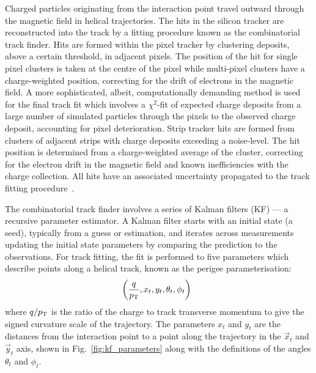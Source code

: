Charged particles originating from the interaction point travel outward through the magnetic field in helical trajectories. The hits in the silicon tracker are reconstructed into the track by a fitting procedure known as the combinatorial track finder. Hits are formed within the pixel tracker by clustering deposits, above a certain threshold, in adjacent pixels. The position of the hit for single pixel clusters is taken at the centre of the pixel while multi-pixel clusters have a charge-weighted position, correcting for the drift of electrons in the magnetic field. A more sophisticated, albeit, computationally demanding method is used for the final track fit which involves a $\chi^2$-fit of expected charge deposits from a large number of simulated particles through the pixels to the observed charge deposit, accounting for pixel deterioration. Strip tracker hits are formed from clusters of adjacent strips with charge deposits exceeding a noise-level. The hit position is determined from a charge-weighted average of the cluster, correcting for the electron drift in the magnetic field and known inefficiencies with the charge collection. All hits have an associated uncertainty propagated to the track fitting procedure~\cite{Chatrchyan:1704291}.

The combinatorial track finder involves a series of Kalman filters (KF) \cite{Kalman:1960} --- a recursive parameter estimator. A Kalman filter starts with an initial state (a seed), typically from a guess or estimation, and iterates across measurements updating the initial state parameters by comparing the prediction to the observations. For track fitting, the fit is performed to five parameters which describe points along a helical track, known as the perigee parameterisation:
%
\begin{equation}
    \left( \frac{q}{p_{\text{T}}}, x_t, y_t, \theta_t, \phi_t \right)\ \,
\end{equation}
%
where $q/p_{\text{T}}$ is the ratio of the charge to track transverse momentum to give the signed curvature scale of the trajectory. The parameters $x_t$ and $y_t$ are the distances from the interaction point to a point along the trajectory in the $\vec{x}_t$ and $\vec{y}_t$ axis, shown in Fig.~\ref{fig:kf_parameters} along with the definitions of the angles $\theta_t$ and $\phi_t$.

